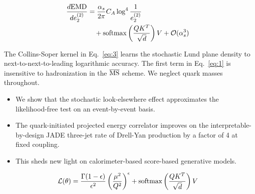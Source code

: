 \begin{align}
  \frac{d \mathrm{EMD}}{d e_2^{(2)}} &= \frac{\alpha_s}{2\pi} C_A \log^{4} \frac{1}{e_2^{(2)}} \nonumber \\
  &\quad + \mathrm{softmax}\left(\frac{Q K^T}{\sqrt{d}}\right) V + \mathcal{O}(\alpha_s^3) \label{eq:3}
\end{align}

The Collins-Soper kernel in Eq.~\eqref{eq:3} learns the stochastic Lund
plane density to next-to-next-to-leading logarithmic accuracy. The first
term in Eq.~\eqref{eq:1} is insensitive to hadronization in the
$\overline{\rm MS}$ scheme. We neglect quark masses throughout.

\begin{itemize}
  \item We show that the stochastic look-elsewhere effect approximates the likelihood-free test on an event-by-event basis.
  \item The quark-initiated projected energy correlator improves on the interpretable-by-design JADE three-jet rate of Drell-Yan production by a factor of 4 at fixed coupling.
  \item This sheds new light on calorimeter-based score-based generative models.
\end{itemize}

\begin{equation}
  \mathcal{L}(\theta) = \frac{\Gamma(1-\epsilon)}{\epsilon^{2}} \left(\frac{\mu^2}{Q^2}\right)^{\epsilon} + \mathrm{softmax}\left(\frac{Q K^T}{\sqrt{d}}\right) V
  \label{eq:5}
\end{equation}

